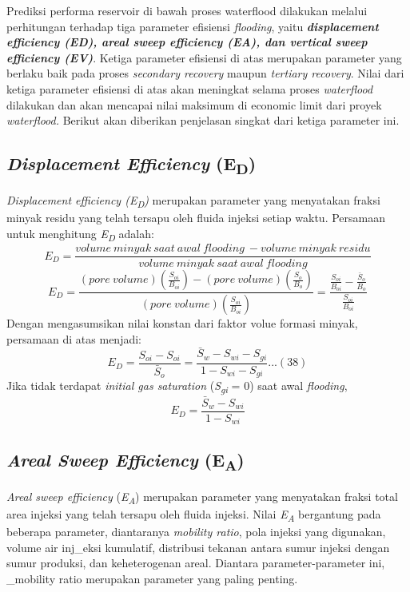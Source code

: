\documentclass[
]{book}
\begin{document}
Prediksi performa reservoir di bawah proses waterflood dilakukan melalui perhitungan terhadap tiga parameter efisiensi \emph{flooding}, yaitu \textbf{\emph{displacement efficiency (E\emph{D}), areal sweep efficiency (E\emph{A}), dan vertical sweep efficiency (E\emph{V})}}. Ketiga parameter efisiensi di atas merupakan parameter yang berlaku baik pada proses \emph{secondary recovery} maupun \emph{tertiary recovery}. Nilai dari ketiga parameter efisiensi di atas akan meningkat selama proses \emph{waterflood} dilakukan dan akan mencapai nilai maksimum di economic limit dari proyek \emph{waterflood.} Berikut akan diberikan penjelasan singkat dari ketiga parameter ini.

\hypertarget{displacement-efficiency-ed}{%
\subsection{\texorpdfstring{\emph{Displacement Efficiency} (E\textsubscript{D})}{Displacement Efficiency (ED)}}\label{displacement-efficiency-ed}}

\emph{Displacement efficiency (E\textsubscript{D})} merupakan parameter yang menyatakan fraksi minyak residu yang telah tersapu oleh fluida injeksi setiap waktu. Persamaan untuk menghitung \emph{E\textsubscript{D}} adalah:
\[E_D = \frac{volume\ minyak\ saat\ awal\ flooding\ - volume\ minyak\ residu}{volume\ minyak\ saat\ awal\ flooding}\]
\[E_D = \frac{(pore\ volume)(\frac{S_{oi}}{B_{oi}})-(pore\ volume)(\frac{S_{o}}{B_{o}})}{(pore\ volume)(\frac{S_{oi}}{B_{oi}})} = \frac{\frac{S_{oi}}{B_{oi}}-\frac{\bar S_{o}}{B_{o}}}{\frac{S_{oi}}{B_{oi}}}\]
Dengan mengasumsikan nilai konstan dari faktor volue formasi minyak, persamaan di atas menjadi:
\[E_D = \frac{S_{oi}-S_{oi}}{\bar S_{o}}=\frac{\bar S_{w} - S_{wi} - S_{gi}}{1 - S_{wi} - S_{gi}}...(38)\]
Jika tidak terdapat \emph{initial gas saturation} (\emph{S\textsubscript{gi}} = 0) saat awal \emph{flooding},
\[E_D = \frac{\bar S_{w} - S_{wi}}{1-S_{wi}}\]

\hypertarget{areal-sweep-efficiency-ea}{%
\subsection{\texorpdfstring{\emph{Areal Sweep Efficiency} (E\textsubscript{A})}{Areal Sweep Efficiency (EA)}}\label{areal-sweep-efficiency-ea}}

\emph{Areal sweep efficiency} (\emph{E\textsubscript{A}}) merupakan parameter yang menyatakan fraksi total area injeksi yang telah tersapu oleh fluida injeksi. Nilai \emph{E\textsubscript{A}} bergantung pada beberapa parameter, diantaranya \emph{mobility ratio}, pola injeksi yang digunakan, volume air inj\_eksi kumulatif, distribusi tekanan antara sumur injeksi dengan sumur produksi, dan keheterogenan areal. Diantara parameter-parameter ini, \_mobility ratio merupakan parameter yang paling penting.
\end{document}
